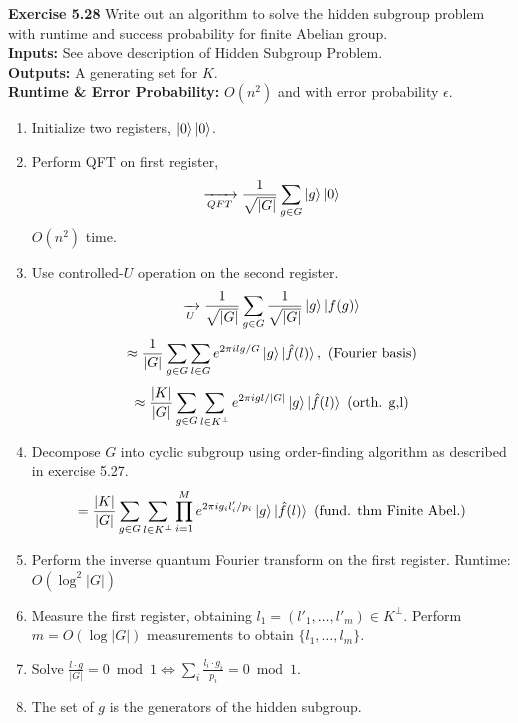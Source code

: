 \documentclass{article}
\begin{document}
\begin{tcolorbox}\textbf{Exercise 5.28} Write out an algorithm to solve the hidden subgroup problem with runtime and success probability for finite Abelian group.\\
	\textbf{Inputs:} See above description of Hidden Subgroup Problem.\\
	\textbf{Outputs:} A generating set for $K$.\\
	\textbf{Runtime \& Error Probability:} $O(n^2)$ and with error probability $\epsilon$.
	\begin{enumerate}
		\item Initialize two registers, $\ket{0}\ket{0}$.
		\item Perform QFT on first register, $$\xrightarrow[QFT]{} \frac{1}{\sqrt{|G|}} \sum_{g\in G}\ket{g} \ket{0}$$ $O(n^2)$ time.
		\item Use controlled-$U$ operation on the second register.
			$$\xrightarrow[U]{} \frac{1}{\sqrt{|G|}} \sum_{g \in G} \frac{1}{\sqrt{|G|}} \ket{g}\ket{f(g)}$$
			$$\approx \frac{1}{|G|} \sum_{g\in G}\sum_{l \in G} e^{2\pi ilg/G}\ket{g}\ket{\hat{f}(l)}, \text{   (Fourier basis)}$$
			$$ \approx \frac{|K|}{|G|} \sum_{g \in G}\sum_{l \in K^\perp} e^{2\pi i gl/ |G|} \ket{g}\ket{\hat{f}(l)} \text{  (orth. g,l)}$$
		\item Decompose $G$ into cyclic subgroup using order-finding algorithm as described in exercise 5.27.
			$$ = \frac{|K|}{|G|} \sum_{g \in G} \sum_{l \in K^\perp} \prod^{M}_{i=1} e^{2\pi i g_i l_i'/p_i} \ket{g} \ket{\hat{f}(l)} \text{   (fund. thm Finite Abel.)}$$
		\item Perform the inverse quantum Fourier transform on the first register. Runtime: $O(\log^2|G|)$
		\item Measure the first register, obtaining $l_1 = (l'_1, \dots, l'_m) \in K^\perp$. Perform $m = O(\log |G|)$ measurements to obtain $\{ l_1, \dots, l_m\}$.
		\item Solve $ \frac{l \cdot g}{|G|} = 0 \bmod 1  \iff \sum_i \frac{l_i \cdot g_i}{p_i} = 0 \bmod 1$. 
		\item The set of $g$ is the generators of the hidden subgroup.
	 \end{enumerate}
\end{tcolorbox}
\end{document}
